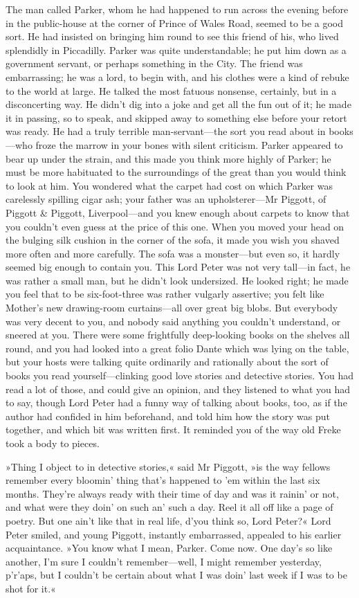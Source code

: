 The man called Parker, whom he had happened to run across the evening before in the public-house at the corner of Prince of Wales Road, seemed to be a good sort. He had insisted on bringing him round to see this friend of his, who lived splendidly in Piccadilly. Parker was quite understandable; he put him down as a government servant, or perhaps something in the City. The friend was embarrassing; he was a lord, to begin with, and his clothes were a kind of rebuke to the world at large. He talked the most fatuous nonsense, certainly, but in a disconcerting way. He didn't dig into a joke and get all the fun out of it; he made it in passing, so to speak, and skipped away to something else before your retort was ready. He had a truly terrible man-servant—the sort you read about in books—who froze the marrow in your bones with silent criticism. Parker appeared to bear up under the strain, and this made you think more highly of Parker; he must be more habituated to the surroundings of the great than you would think to look at him. You wondered what the carpet had cost on which Parker was carelessly spilling cigar ash; your father was an upholsterer—Mr Piggott, of Piggott \& Piggott, Liverpool—and you knew enough about carpets to know that you couldn't even guess at the price of this one. When you moved your head on the bulging silk cushion in the corner of the sofa, it made you wish you shaved more often and more carefully. The sofa was a monster—but even so, it hardly seemed big enough to contain you. This Lord Peter was not very tall—in fact, he was rather a small man, but he didn't look undersized. He looked right; he made you feel that to be six-foot-three was rather vulgarly assertive; you felt like Mother's new drawing-room curtains—all over great big blobs. But everybody was very decent to you, and nobody said anything you couldn't understand, or sneered at you. There were some frightfully deep-looking books on the shelves all round, and you had looked into a great folio Dante which was lying on the table, but your hosts were talking quite ordinarily and rationally about the sort of books you read yourself—clinking good love stories and detective stories. You had read a lot of those, and could give an opinion, and they listened to what you had to say, though Lord Peter had a funny way of talking about books, too, as if the author had confided in him beforehand, and told him how the story was put together, and which bit was written first. It reminded you of the way old Freke took a body to pieces.

»Thing I object to in detective stories,« said Mr Piggott, »is the way fellows remember every bloomin' thing that's happened to 'em within the last six months. They're always ready with their time of day and was it rainin' or not, and what were they doin' on such an' such a day. Reel it all off like a page of poetry. But one ain't like that in real life, d'you think so, Lord Peter?« Lord Peter smiled, and young Piggott, instantly embarrassed, appealed to his earlier acquaintance. »You know what I mean, Parker. Come now. One day's so like another, I'm sure I couldn't remember—well, I might remember yesterday, p'r'aps, but I couldn't be certain about what I was doin' last week if I was to be shot for it.«

